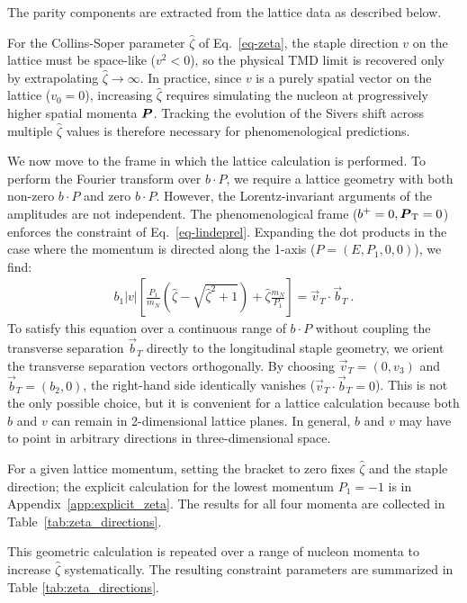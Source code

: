 The parity components are extracted from the lattice data as described below.


For the Collins-Soper parameter $\hat{\zeta}$ of Eq.~\eqref{eq-zeta}, the staple direction $v$ on the lattice must be space-like ($v^2 < 0$), so the physical TMD limit is recovered only by extrapolating $\hat{\zeta} \to \infty$. In practice, since $v$ is a purely spatial vector on the lattice ($v_0 = 0$), increasing $\hat{\zeta}$ requires simulating the nucleon at progressively higher spatial momenta $\boldsymbol{P}$. Tracking the evolution of the Sivers shift across multiple $\hat{\zeta}$ values is therefore necessary for phenomenological predictions.

We now move to the frame in which the lattice calculation is performed. To perform the Fourier transform over $b \cdot P$, we require a lattice geometry with both non-zero $b \cdot P$ and zero $b \cdot P$. However, the Lorentz-invariant arguments of the amplitudes are not independent. The phenomenological frame ($b^+=0, \boldsymbol{P}_{\mathrm T}=0$) enforces the constraint of Eq.~\eqref{eq-lindeprel}. Expanding the dot products in the case where the momentum is directed along the 1-axis ($P = (E, P_1, 0, 0)$), we find:
\begin{align}
    b_{1}|v|\left[\frac{P_{1}}{m_{N}}\left(\hat{\zeta}-\sqrt{\hat{\zeta}^2+1}\right)+\hat{\zeta}\frac{m_{N}}{P_{1}}\right]=\vec{v}_{T}\cdot\vec{b}_{T} \ .\label{constraints}
\end{align}
To satisfy this equation over a continuous range of $b \cdot P$ without coupling the transverse separation $\vec{b}_T$ directly to the longitudinal staple geometry, we orient the transverse separation vectors orthogonally. By choosing $\vec{v}_{T}=(0,v_{3})$ and $\vec{b}_{T}=(b_{2},0)$, the right-hand side identically vanishes ($\vec{v}_{T}\cdot\vec{b}_{T} = 0$). This is not the only possible choice, but it is convenient for a lattice calculation because both $b$ and $v$ can remain in 2-dimensional lattice planes. In general, $b$ and $v$ may have to point in arbitrary directions in three-dimensional space.

For a given lattice momentum, setting the bracket to zero fixes $\hat\zeta$ and the staple direction; the explicit calculation for the lowest momentum $P_1=-1$ is in Appendix~\ref{app:explicit_zeta}. The results for all four momenta are collected in Table~\ref{tab:zeta_directions}.


This geometric calculation is repeated over a range of nucleon momenta to increase $\hat{\zeta}$ systematically. The resulting constraint parameters are summarized in Table \ref{tab:zeta_directions}.

